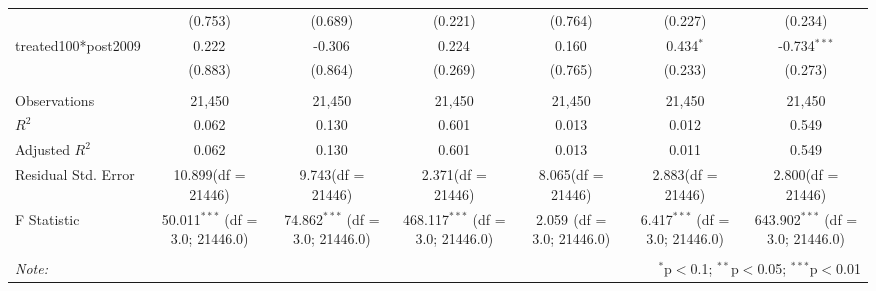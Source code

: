 \documentclass[12pt]{article}
\begin{document}
\begin{table}[!htbp]
\begin{tabular}{@{\extracolsep{5pt}}lcccccc}
  & (0.753) & (0.689) & (0.221) & (0.764) & (0.227) & (0.234) \\
 treated100*post2009 & 0.222$^{}$ & -0.306$^{}$ & 0.224$^{}$ & 0.160$^{}$ & 0.434$^{*}$ & -0.734$^{***}$ \\
  & (0.883) & (0.864) & (0.269) & (0.765) & (0.233) & (0.273) \\
\hline \\[-1.8ex]
 Observations & 21,450 & 21,450 & 21,450 & 21,450 & 21,450 & 21,450 \\
 $R^2$ & 0.062 & 0.130 & 0.601 & 0.013 & 0.012 & 0.549 \\
 Adjusted $R^2$ & 0.062 & 0.130 & 0.601 & 0.013 & 0.011 & 0.549 \\
 Residual Std. Error & 10.899(df = 21446) & 9.743(df = 21446) & 2.371(df = 21446) & 8.065(df = 21446) & 2.883(df = 21446) & 2.800(df = 21446)  \\
 F Statistic & 50.011$^{***}$ (df = 3.0; 21446.0) & 74.862$^{***}$ (df = 3.0; 21446.0) & 468.117$^{***}$ (df = 3.0; 21446.0) & 2.059$^{}$ (df = 3.0; 21446.0) & 6.417$^{***}$ (df = 3.0; 21446.0) & 643.902$^{***}$ (df = 3.0; 21446.0) \\
\hline
\hline \\[-1.8ex]
\textit{Note:} & \multicolumn{6}{r}{$^{*}$p$<$0.1; $^{**}$p$<$0.05; $^{***}$p$<$0.01} \\
\end{tabular}
\end{table}
\end{document}
